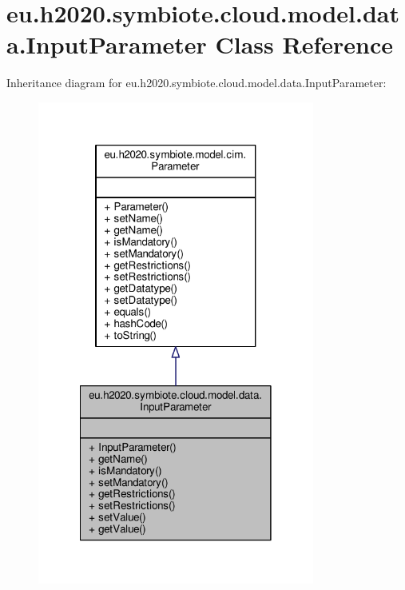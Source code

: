 \hypertarget{classeu_1_1h2020_1_1symbiote_1_1cloud_1_1model_1_1data_1_1InputParameter}{}\section{eu.\+h2020.\+symbiote.\+cloud.\+model.\+data.\+Input\+Parameter Class Reference}
\label{classeu_1_1h2020_1_1symbiote_1_1cloud_1_1model_1_1data_1_1InputParameter}


Inheritance diagram for eu.\+h2020.\+symbiote.\+cloud.\+model.\+data.\+Input\+Parameter\+:
\nopagebreak
\begin{figure}[H]
\begin{center}
\leavevmode
\includegraphics[width=258pt]{classeu_1_1h2020_1_1symbiote_1_1cloud_1_1model_1_1data_1_1InputParameter__inherit__graph}
\end{center}
\end{figure}


